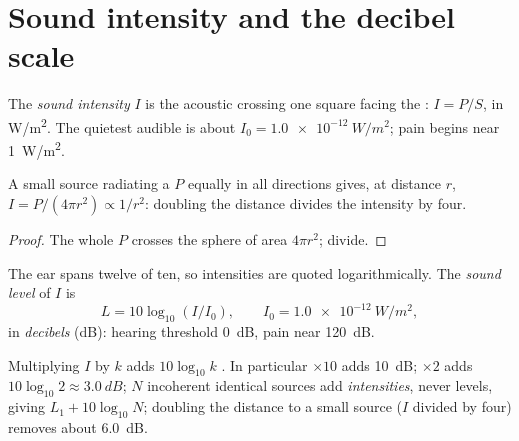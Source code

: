 \section{Sound intensity and the decibel scale}

\begin{definition}\label{def:g12:sound-acoustics:intensity}
The \emph{sound intensity} $I$ is the
acoustic  crossing one square  facing the :
$I = P/S$, in \unit{W/m^2}. The quietest audible  is about
$I_0 = \qty{1.0e-12}{W/m^2}$; pain begins near \qty{1}{W/m^2}.
\end{definition}

\begin{proposition}\label{prop:g12:sound-acoustics:inverse-square}
%
A small source radiating a  $P$ equally in all directions
gives, at distance $r$, $I = P/(4\pi r^2) \propto 1/r^2$: doubling
the distance divides the intensity by four.
\end{proposition}

\begin{proof}
The whole  $P$ crosses the sphere of area $4\pi r^2$; divide.
\end{proof}

\begin{definition}\label{def:g12:sound-acoustics:level}
The ear spans twelve  of ten, so intensities are quoted
logarithmically. The \emph{sound level} of $I$ is
\[ L = 10 \log_{10}(I/I_0), \qquad I_0 = \qty{1.0e-12}{W/m^2}, \]
in \emph{decibels} (\unit{dB}): hearing threshold
\qty{0}{dB}, pain near \qty{120}{dB}.
\end{definition}

\begin{proposition}\label{prop:g12:sound-acoustics:db-arithmetic}
Multiplying $I$ by $k$ adds $10\log_{10}k$ . In particular
$\times 10$ adds \qty{10}{dB}; $\times 2$ adds
$10\log_{10}2 \approx \qty{3.0}{dB}$; $N$ incoherent identical
sources add \emph{intensities}, never levels, giving
$L_1 + 10\log_{10}N$; doubling the distance to a small source ($I$
divided by four) removes about \qty{6.0}{dB}.
\end{proposition}

